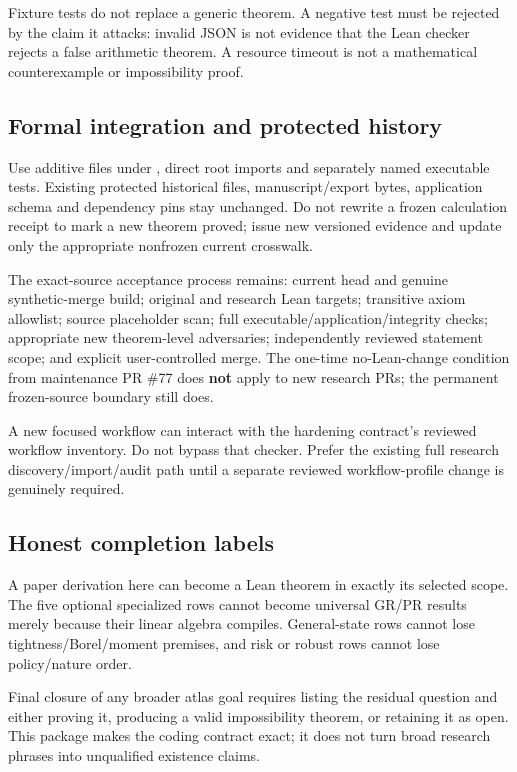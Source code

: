 \documentclass[
  11pt,
  a4paper,
]{article}
\newcommand{\codewrap}[1]{{\ttfamily\seqsplit{#1}}}
\begin{document}
Fixture tests do not replace a generic theorem. A negative test must be
rejected by the claim it attacks: invalid JSON is not evidence that the
Lean checker rejects a false arithmetic theorem. A resource timeout is
not a mathematical counterexample or impossibility proof.

\subsection{Formal integration and protected
history}\label{formal-integration-and-protected-history}

Use additive files under \codewrap{PermanssonResearch/}, direct root
imports and separately named executable tests. Existing protected
historical files, manuscript/export bytes, application schema and
dependency pins stay unchanged. Do not rewrite a frozen calculation
receipt to mark a new theorem proved; issue new versioned evidence and
update only the appropriate nonfrozen current crosswalk.

The exact-source acceptance process remains: current head and genuine
synthetic-merge build; original and research Lean targets; transitive
axiom allowlist; source placeholder scan; full
executable/application/integrity checks; appropriate new theorem-level
adversaries; independently reviewed statement scope; and explicit
user-controlled merge. The one-time no-Lean-change condition from
maintenance PR \#77 does \textbf{not} apply to new research PRs; the
permanent frozen-source boundary still does.

A new focused workflow can interact with the hardening contract's
reviewed workflow inventory. Do not bypass that checker. Prefer the
existing full research discovery/import/audit path until a separate
reviewed workflow-profile change is genuinely required.

\subsection{Honest completion labels}\label{honest-completion-labels}

A paper derivation here can become a Lean theorem in exactly its
selected scope. The five optional specialized rows cannot become
universal GR/PR results merely because their linear algebra compiles.
General-state rows cannot lose tightness/Borel/moment premises, and risk
or robust rows cannot lose policy/nature order.

Final closure of any broader atlas goal requires listing the residual
question and either proving it, producing a valid impossibility theorem,
or retaining it as open. This package makes the coding contract exact;
it does not turn broad research phrases into unqualified existence
claims.
\end{document}
